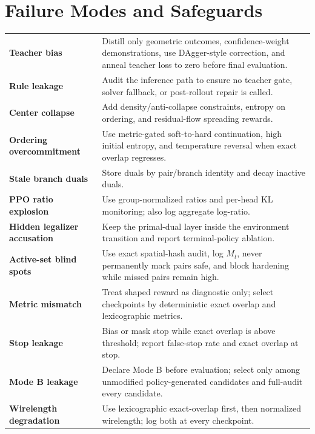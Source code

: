 \documentclass[11pt]{article}
\begin{document}
\section{Failure Modes and Safeguards}

\begin{center}
\small
\begin{tabularx}{\textwidth}{>{\bfseries\color{red!80!black}}p{}Y}
Teacher bias & Distill only geometric outcomes, confidence-weight demonstrations, use DAgger-style correction, and anneal teacher loss to zero before final evaluation. \\
Rule leakage & Audit the inference path to ensure no teacher gate, solver fallback, or post-rollout repair is called. \\
Center collapse & Add density/anti-collapse constraints, entropy on ordering, and residual-flow spreading rewards. \\
Ordering overcommitment & Use metric-gated soft-to-hard continuation, high initial entropy, and temperature reversal when exact overlap regresses. \\
Stale branch duals & Store duals by pair/branch identity and decay inactive duals. \\
PPO ratio explosion & Use group-normalized ratios and per-head KL monitoring; also log aggregate log-ratio. \\
Hidden legalizer accusation & Keep the primal-dual layer inside the environment transition and report terminal-policy ablation. \\
Active-set blind spots & Use exact spatial-hash audit, log $M_t$, never permanently mark pairs safe, and block hardening while missed pairs remain high. \\
Metric mismatch & Treat shaped reward as diagnostic only; select checkpoints by deterministic exact overlap and lexicographic metrics. \\
Stop leakage & Bias or mask stop while exact overlap is above threshold; report false-stop rate and exact overlap at stop. \\
Mode B leakage & Declare Mode B before evaluation; select only among unmodified policy-generated candidates and full-audit every candidate. \\
Wirelength degradation & Use lexicographic exact-overlap first, then normalized wirelength; log both at every checkpoint. \\
\end{tabularx}
\end{center}
\end{document}
